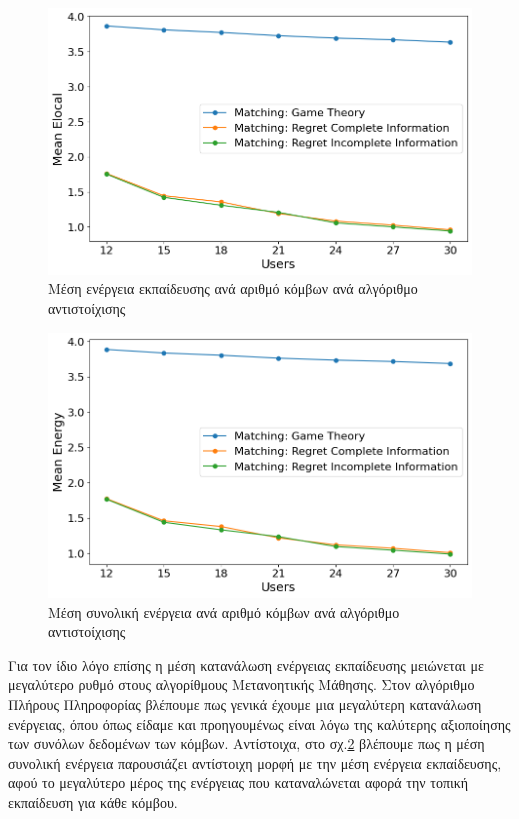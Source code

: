 \newpage

\begin{figure}[H]
    \centering
    \includegraphics[width=\textwidth]{figures/chapter4/Mean_Elocal_vs_Users.png}
    \caption{Μέση ενέργεια εκπαίδευσης ανά αριθμό κόμβων ανά αλγόριθμο αντιστοίχισης}
    \label{fig35}
\end{figure}

\begin{figure}[H]
    \centering
    \includegraphics[width=\textwidth]{figures/chapter4/Mean_Energy_vs_Users.png}
    \caption{Μέση συνολική ενέργεια ανά αριθμό κόμβων ανά αλγόριθμο αντιστοίχισης}
    \label{fig36}
\end{figure}

\newpage

Για τον ίδιο λόγο επίσης η μέση κατανάλωση ενέργειας εκπαίδευσης μειώνεται με μεγαλύτερο ρυθμό στους αλγορίθμους Μετανοητικής Μάθησης. Στον αλγόριθμο Πλήρους Πληροφορίας βλέπουμε πως γενικά έχουμε μια μεγαλύτερη κατανάλωση ενέργειας, όπου όπως είδαμε και προηγουμένως είναι λόγω της καλύτερης αξιοποίησης των συνόλων δεδομένων των κόμβων. Αντίστοιχα, στο σχ.\ref{fig36} βλέπουμε πως η μέση συνολική ενέργεια παρουσιάζει αντίστοιχη μορφή με την μέση ενέργεια εκπαίδευσης, αφού το μεγαλύτερο μέρος της ενέργειας που καταναλώνεται αφορά την τοπική εκπαίδευση για κάθε κόμβου.

